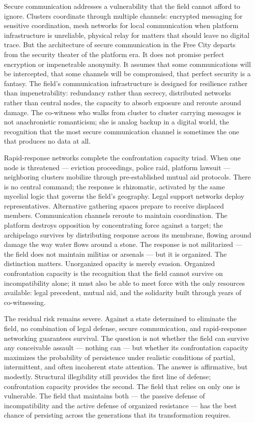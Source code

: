 Secure communication addresses a vulnerability that the field cannot afford to ignore. Clusters coordinate through multiple channels: encrypted messaging for sensitive coordination, mesh networks for local communication when platform infrastructure is unreliable, physical relay for matters that should leave no digital trace. But the architecture of secure communication in the Free City departs from the security theater of the platform era. It does not promise perfect encryption or impenetrable anonymity. It assumes that some communications will be intercepted, that some channels will be compromised, that perfect security is a fantasy. The field's communication infrastructure is designed for resilience rather than impenetrability: redundancy rather than secrecy, distributed networks rather than central nodes, the capacity to absorb exposure and reroute around damage. The co-witness who walks from cluster to cluster carrying messages is not anachronistic romanticism; she is analog backup in a digital world, the recognition that the most secure communication channel is sometimes the one that produces no data at all.

Rapid-response networks complete the confrontation capacity triad. When one node is threatened — eviction proceedings, police raid, platform lawsuit — neighboring clusters mobilize through pre-established mutual aid protocols. There is no central command; the response is rhizomatic, activated by the same mycelial logic that governs the field's geography. Legal support networks deploy representatives. Alternative gathering spaces prepare to receive displaced members. Communication channels reroute to maintain coordination. The platform destroys opposition by concentrating force against a target; the archipelago survives by distributing response across its membrane, flowing around damage the way water flows around a stone. The response is not militarized — the field does not maintain militias or arsenals — but it is organized. The distinction matters. Unorganized opacity is merely evasion. Organized confrontation capacity is the recognition that the field cannot survive on incompatibility alone; it must also be able to meet force with the only resources available: legal precedent, mutual aid, and the solidarity built through years of co-witnessing.

The residual risk remains severe. Against a state determined to eliminate the field, no combination of legal defense, secure communication, and rapid-response networking guarantees survival. The question is not whether the field can survive any conceivable assault — nothing can — but whether its confrontation capacity maximizes the probability of persistence under realistic conditions of partial, intermittent, and often incoherent state attention. The answer is affirmative, but modestly. Structural illegibility still provides the first line of defense; confrontation capacity provides the second. The field that relies on only one is vulnerable. The field that maintains both — the passive defense of incompatibility and the active defense of organized resistance — has the best chance of persisting across the generations that its transformation requires.

